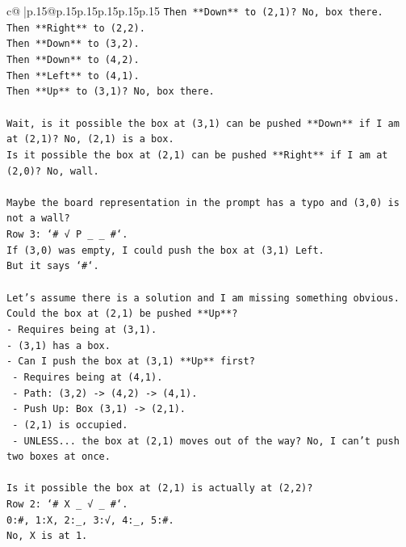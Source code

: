 \documentclass{article}
\begin{document}
{\begin{supertabular}{c@{$\;$}|p{.15\linewidth}@{}p{.15\linewidth}p{.15\linewidth}p{.15\linewidth}p{.15\linewidth}p{.15\linewidth}}
{{{\texttt{Then **Down** to (2,1)? No, box there.} \\
\texttt{Then **Right** to (2,2).} \\
\texttt{Then **Down** to (3,2).} \\
\texttt{Then **Down** to (4,2).} \\
\texttt{Then **Left** to (4,1).} \\
\texttt{Then **Up** to (3,1)? No, box there.} \\
\\ 
\texttt{Wait, is it possible the box at (3,1) can be pushed **Down** if I am at (2,1)? No, (2,1) is a box.} \\
\texttt{Is it possible the box at (2,1) can be pushed **Right** if I am at (2,0)? No, wall.} \\
\\ 
\texttt{Maybe the board representation in the prompt has a typo and (3,0) is not a wall?} \\
\texttt{Row 3: `\# √ P \_ \_ \#`.} \\
\texttt{If (3,0) was empty, I could push the box at (3,1) Left.} \\
\texttt{But it says `\#`.} \\
\\ 
\texttt{Let's assume there is a solution and I am missing something obvious.} \\
\texttt{Could the box at (2,1) be pushed **Up**?} \\
\texttt{{-} Requires being at (3,1).} \\
\texttt{{-} (3,1) has a box.} \\
\texttt{{-} Can I push the box at (3,1) **Up** first?} \\
\texttt{  {-} Requires being at (4,1).} \\
\texttt{  {-} Path: (3,2) {-}> (4,2) {-}> (4,1).} \\
\texttt{  {-} Push Up: Box (3,1) {-}> (2,1).} \\
\texttt{  {-} (2,1) is occupied.} \\
\texttt{  {-} UNLESS... the box at (2,1) moves out of the way? No, I can't push two boxes at once.} \\
\\ 
\texttt{Is it possible the box at (2,1) is actually at (2,2)?} \\
\texttt{Row 2: `\# X \_ √ \_ \#`.} \\
\texttt{0:\#, 1:X, 2:\_, 3:√, 4:\_, 5:\#.} \\
\texttt{No, X is at 1.} \\
}}}
\end{supertabular}}
\end{document}
